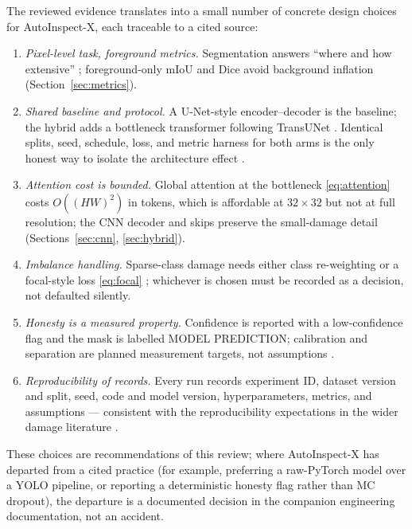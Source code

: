 \documentclass[conference]{IEEEtran}
\begin{document}
The reviewed evidence translates into a small number of concrete design choices
for AutoInspect-X, each traceable to a cited source:
\begin{enumerate}
  \item \emph{Pixel-level task, foreground metrics.} Segmentation answers
  ``where and how extensive'' \cite{cardd2023,hasan2025}; foreground-only mIoU
  and Dice avoid background inflation (Section~\ref{sec:metrics}).
  \item \emph{Shared baseline and protocol.} A U-Net-style encoder--decoder
  \cite{unet2015} is the baseline; the hybrid adds a bottleneck transformer
  following TransUNet \cite{transunet2021}. Identical splits, seed, schedule,
  loss, and metric harness for both arms is the only honest way to isolate the
  architecture effect \cite{hasan2025}.
  \item \emph{Attention cost is bounded.} Global attention at the bottleneck
  \eqref{eq:attention} costs $O((HW)^2)$ in tokens, which is affordable at
  $32\times32$ but not at full resolution; the CNN decoder and skips preserve
  the small-damage detail (Sections~\ref{sec:cnn}, \ref{sec:hybrid}).
  \item \emph{Imbalance handling.} Sparse-class damage needs either class
  re-weighting or a focal-style loss \eqref{eq:focal} \cite{lin2017focal};
  whichever is chosen must be recorded as a decision, not defaulted silently.
  \item \emph{Honesty is a measured property.} Confidence is reported with a
  low-confidence flag and the mask is labelled MODEL PREDICTION; calibration and
  separation are planned measurement targets, not assumptions \cite{kendall2017,
  mcdropout2016,deepensembles2017}.
  \item \emph{Reproducibility of records.} Every run records experiment ID,
  dataset version and split, seed, code and model version, hyperparameters,
  metrics, and assumptions --- consistent with the reproducibility expectations
  in the wider damage literature \cite{hasan2025}.
\end{enumerate}
These choices are recommendations of this review; where AutoInspect-X has
departed from a cited practice (for example, preferring a raw-PyTorch model over
a YOLO pipeline, or reporting a deterministic honesty flag rather than MC
dropout), the departure is a documented decision in the companion engineering
documentation, not an accident.
\end{document}
